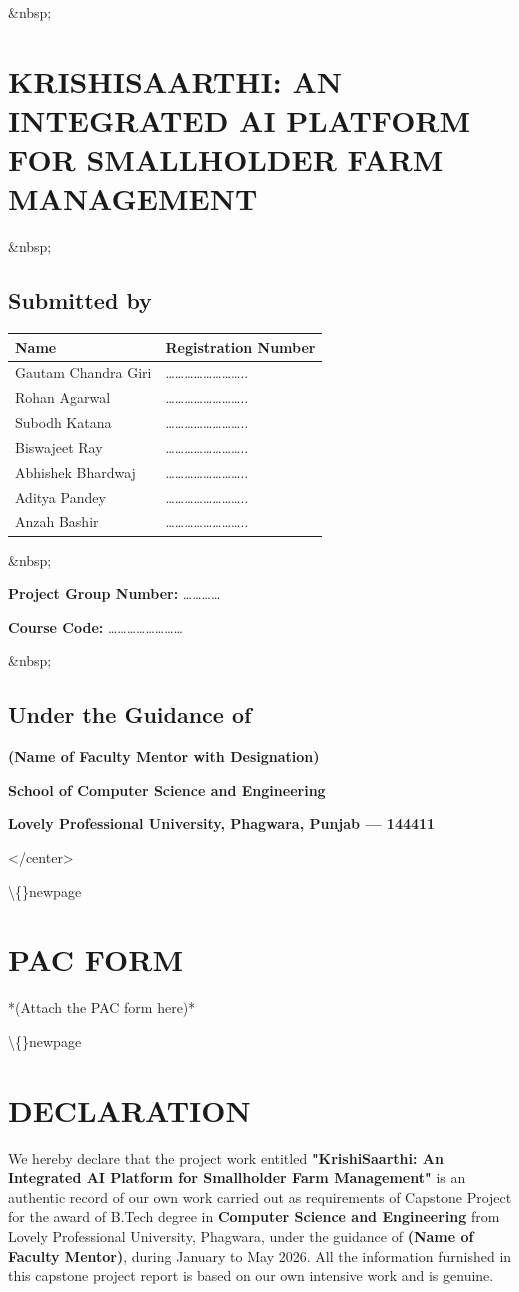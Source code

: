 \documentclass[12pt, a4paper]{report}
\begin{document}
\&nbsp;

\section{KRISHISAARTHI: AN INTEGRATED AI PLATFORM FOR SMALLHOLDER FARM MANAGEMENT}
\&nbsp;

\subsection{Submitted by}
\begin{table}[htbp]
\centering
\small
\begin{tabularx}{\textwidth}{|X|X|}
\hline
Name & Registration Number \\
\hline
Gautam Chandra Giri & …………………….. \\
Rohan Agarwal & …………………….. \\
Subodh Katana & …………………….. \\
Biswajeet Ray & …………………….. \\
Abhishek Bhardwaj & …………………….. \\
Aditya Pandey & …………………….. \\
Anzah Bashir & …………………….. \\
\hline
\end{tabularx}
\end{table}

\&nbsp;

\textbf{Project Group Number:} …………

\textbf{Course Code:} ……………………

\&nbsp;

\subsection{Under the Guidance of}
\textbf{(Name of Faculty Mentor with Designation)}

\textbf{School of Computer Science and Engineering}

\textbf{Lovely Professional University, Phagwara, Punjab --- 144411}

</center>

\textbackslash\{\}newpage

\section{PAC FORM}
*(Attach the PAC form here)*

\textbackslash\{\}newpage

\section{DECLARATION}
We hereby declare that the project work entitled \textbf{"KrishiSaarthi: An Integrated AI Platform for Smallholder Farm Management"} is an authentic record of our own work carried out as requirements of Capstone Project for the award of B.Tech degree in \textbf{Computer Science and Engineering} from Lovely Professional University, Phagwara, under the guidance of \textbf{(Name of Faculty Mentor)}, during January to May 2026. All the information furnished in this capstone project report is based on our own intensive work and is genuine.
\end{document}

